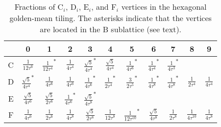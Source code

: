 \documentclass[aps,twocolumn,pra,superscriptaddress,amsmath,amssymb]{revtex4-1}
\begin{document}
\begin{center}
  \begin{table}
    \caption{Fractions of C$_i$, D$_i$, E$_i$, and F$_i$ vertices
      in the hexagonal golden-mean tiling.
      The asterisks indicate that the vertices are located in
      the B sublattice (see text). 
    }
    \begin{tabular}{c|cccccccccc}
      \hline
      \hline
      &0&1&2&3&4&5&6&7&8&9\\
      \hline
      C&$\displaystyle\frac{1}{12\tau^6}$&$\displaystyle\frac{1}{12\tau^4}^*$&
      $\displaystyle\frac{1}{4\tau^4}$&$\displaystyle\frac{\sqrt{5}}{4\tau^4}^*$&
      $\displaystyle\frac{\sqrt{5}}{4\tau^4}$&$\displaystyle\frac{1}{4\tau^6}^*$&
      $\displaystyle\frac{1}{4\tau^4}^*$&$\displaystyle\frac{1}{4\tau^3}^*$&\\
      D&$\displaystyle\frac{\sqrt{5}}{4\tau^4}^*$&$\displaystyle\frac{1}{4\tau^6}$&
      $\displaystyle\frac{1}{4\tau^6}$&$\displaystyle\frac{1}{4\tau^6}^*$&
      $\displaystyle\frac{1}{2\tau^4}^*$&$\displaystyle\frac{3}{2\tau^5}^*$&
      $\displaystyle\frac{1}{4\tau^8}^*$&$\displaystyle\frac{1}{4\tau^8}^*$&
      $\displaystyle\frac{1}{2\tau^4}$&$\displaystyle\frac{1}{4\tau^4}$\\
      E&$\displaystyle\frac{\sqrt{5}}{4\tau^6}$&$\displaystyle\frac{\sqrt{5}}{2\tau^6}$&
      $\displaystyle\frac{1}{4\tau^6}^*$&$\displaystyle\frac{\sqrt{5}}{4\tau^8}^*$&\\
      F&$\displaystyle\frac{1}{4\tau^6}$&$\displaystyle\frac{1}{2\tau^6}$&
      $\displaystyle\frac{1}{4\tau^8}$&$\displaystyle\frac{\sqrt{5}}{2\tau^8}$&
      $\displaystyle\frac{1}{12\tau^8}$&$\displaystyle\frac{1}{12\tau^{10}}^*$&
      $\displaystyle\frac{\sqrt{5}}{4\tau^8}$&$\displaystyle\frac{1}{2\tau^8}$&
      $\displaystyle\frac{1}{4\tau^{10}}$&$\displaystyle\frac{1}{4\tau^8}$
      \\
      \hline
      \hline
    \end{tabular}
    \label{table}
  \end{table}
\end{center}
\end{document}
